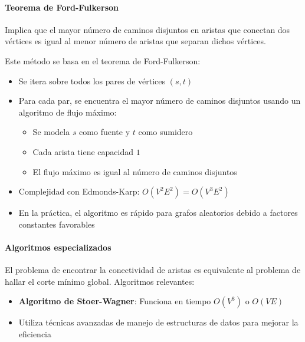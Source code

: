 \documentclass[a4paper]{article}
\begin{document}
\paragraph{Teorema de Ford-Fulkerson}
Implica que el mayor número de caminos disjuntos en aristas que conectan dos vértices es igual al menor número de aristas que separan dichos vértices.

Este método se basa en el teorema de Ford-Fulkerson:
\begin{itemize}
    \item Se itera sobre todos los pares de vértices \((s, t)\)
    \item Para cada par, se encuentra el mayor número de caminos disjuntos usando un algoritmo de flujo máximo:
    \begin{itemize}
        \item Se modela \(s\) como fuente y \(t\) como sumidero
        \item Cada arista tiene capacidad \(1\)
        \item El flujo máximo es igual al número de caminos disjuntos
    \end{itemize}
    \item Complejidad con Edmonds-Karp: \(O(V^2 E^2) = O(V^3 E^2)\)
    \item En la práctica, el algoritmo es rápido para grafos aleatorios debido a factores constantes favorables
\end{itemize}

\paragraph{Algoritmos especializados}
El problema de encontrar la conectividad de aristas es equivalente al problema de hallar el corte mínimo global. Algoritmos relevantes:
\begin{itemize}
    \item \textbf{Algoritmo de Stoer-Wagner}: Funciona en tiempo \(O(V^3)\) o \(O(V E)\)
    \item Utiliza técnicas avanzadas de manejo de estructuras de datos para mejorar la eficiencia
\end{itemize}
\end{document}
